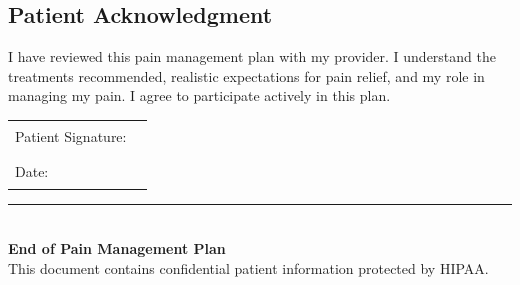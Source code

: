 \documentclass[11pt,letterpaper]{article}
\begin{document}
\subsection*{Patient Acknowledgment}

I have reviewed this pain management plan with my provider. I understand the treatments recommended, realistic expectations for pain relief, and my role in managing my pain. I agree to participate actively in this plan.

\vspace{1em}

\begin{tabular}{ll}
Patient Signature: & \rule{7cm}{0.5pt} \\[1em]
Date: & \rule{4cm}{0.5pt} \\
\end{tabular}

\vspace{2em}
\begin{center}
\rule{\textwidth}{1pt}\\
\textbf{End of Pain Management Plan}\\
This document contains confidential patient information protected by HIPAA.
\end{center}
\end{document}
